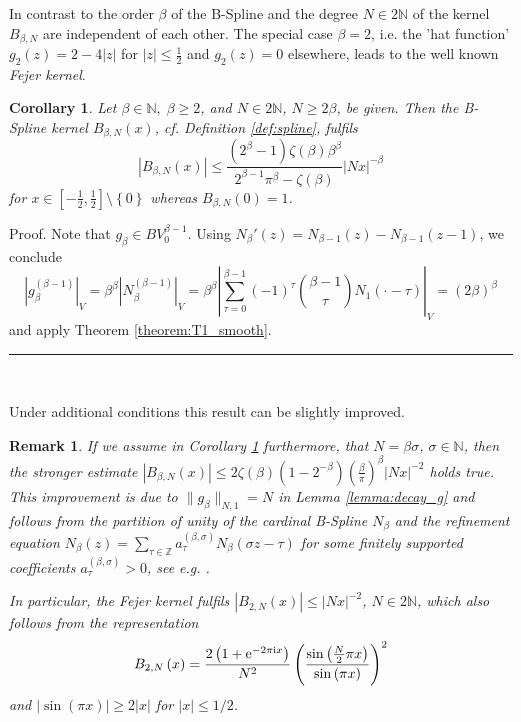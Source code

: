 \documentclass[11pt,a4paper,bibtotoc]{scrartcl}
\def\N{\mathbb{N}}
\def\Z{\mathbb{Z}}
\def\ti{\mbox{\scriptsize{\rm i}}}
\newcommand{\eim}[1]{{\rm e}^{-2\pi{\ti} #1}}
\renewcommand{\Box}{\hspace*{0ex} \hfill \rule{1.5ex}{1.5ex} \\ \goodbreak}
\newtheorem{remark}[theorem]{Remark}
\newtheorem{corollary}[theorem]{Corollary}
\newenvironment{Remark}{\goodbreak \begin{remark}\rm}{\end{remark}}
\newenvironment{Corollary}{\goodbreak \begin{corollary}\rm}{\end{corollary}}
\numberwithin{equation}{section}
\numberwithin{table}{section}
\numberwithin{figure}{section}
\begin{document}
In contrast to \cite{NaSiWa98} the order $\beta$ of the B-Spline and the
degree $N\in 2\N$ of the kernel $B_{\beta,N}$ are independent of each other.
The special case $\beta=2$, i.e. the 'hat function' $g_2(z)=2-4|z|$ for
$|z|\le \frac{1}{2}$ and $g_2(z)=0$ elsewhere, leads to the well known {\em
  Fejer kernel}.

\begin{Corollary}\label{cor:spline}
  Let $\beta \in \mathbb{N},\;\beta\ge 2$, and $N\in2\mathbb{N}$, $N\ge
  2\beta$, be given.
  Then the B-Spline kernel $B_{\beta,N}(x)$, cf. Definition \ref{def:spline},
  fulfils
  \begin{equation*}
    \left| B_{\beta,N}\left(x\right)\right| \le
    \frac{\left(2^{\beta}-1\right)\zeta\left(\beta\right) \beta^{\beta}
    }{2^{\beta-1}\pi^{\beta}-\zeta\left(\beta\right)}
    \left|Nx\right|^{-\beta}
  \end{equation*}
  for $x\in\left[-\frac{1}{2},\frac{1}{2}\right]\setminus \left\{0\right\}$
  whereas $B_{\beta,N}(0)=1$.
\end{Corollary}

Proof. Note that $g_{\beta} \in BV_0^{\beta-1}$.
Using $N_{\beta}'(z)=N_{\beta-1}(z)-N_{\beta-1}(z-1)$, we conclude
\begin{equation*}
  \left|g_{\beta}^{\left(\beta-1\right)}\right|_V
  =\beta^{\beta}\left|N_{\beta}^{\left(\beta-1\right)}\right|_V
  =\beta^{\beta}\left|\sum_{\tau=0}^{\beta-1} \left(-1\right)^{\tau} {\beta-1
  \choose \tau} N_1\left(\cdot-\tau\right)\right|_V
  =\left(2\beta\right)^{\beta}
\end{equation*}
and apply Theorem \ref{theorem:T1_smooth}.
\Box

Under additional conditions this result can be slightly improved.
\begin{Remark}
  If we assume in Corollary \ref{cor:spline} furthermore, that
  $N=\beta\sigma$, $\sigma\in \N$, then the stronger estimate
  $|B_{\beta,N}(x)| \le 2\zeta(\beta)(1-2^{-\beta})
  (\frac{\beta}{\pi})^{\beta}|Nx|^{-2}$ holds true.
  This improvement is due to $\|g_{\beta}\|_{N,1}=N$ in Lemma
  \ref{lemma:decay_g} and follows from the
  partition of unity of the cardinal B-Spline $N_{\beta}$ and the refinement
  equation $N_{\beta}(z)=\sum_{\tau\in \Z} a_{\tau}^{(\beta,\sigma)}
  N_{\beta}(\sigma z - \tau)$ for some finitely supported coefficients
  $a_{\tau}^{(\beta,\sigma)}>0$, see e.g. \cite[pp. 8]{Chui88}.

  In particular, the Fejer kernel fulfils $|B_{2,N}(x)| \le |Nx|^{-2}$, $N\in
  2\N$, which also follows from the representation
  \begin{equation*}
    B_{2,N}\left(x\right)=\frac{2\left(1+\eim{x}\right)}{N^2}
    \left(\frac{\sin\left(\frac{N}{2} \pi x\right)}{\sin 
        \left(\pi x\right)}\right)^{2}
  \end{equation*}
  and $|\sin(\pi x)|\ge 2|x|$ for $|x|\le 1/2$.
\end{Remark}
\end{document}
